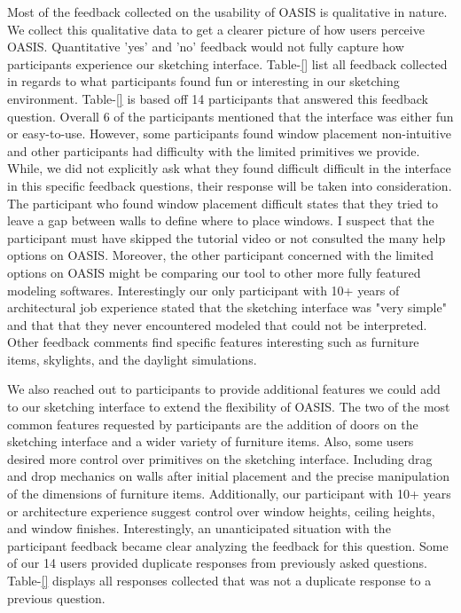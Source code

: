 Most of the feedback collected on the usability of OASIS is qualitative in nature.
We collect this qualitative data to get a clearer picture of how users perceive OASIS.
Quantitative 'yes' and 'no' feedback would not fully capture how participants experience our sketching interface.
Table-\ref{} list all feedback collected in regards to what participants found fun or interesting in our sketching environment.
Table-\ref{} is based off 14 participants that answered this feedback question.
Overall 6 of the participants mentioned that the interface was either fun or easy-to-use.
However, some participants found window placement non-intuitive and other participants had difficulty with the limited primitives we provide.
While, we did not explicitly ask what they found difficult difficult in the interface in this specific feedback questions, their response will be taken into consideration.
The participant who found window placement difficult states that they tried to leave a gap between walls to define where to place windows.
I suspect that the participant must have skipped the tutorial video or not consulted the many help options on OASIS.
Moreover, the other participant concerned with the limited options on OASIS might be comparing our tool to other more fully featured modeling softwares.
Interestingly our only participant with 10+ years of architectural job experience stated that the sketching interface was "very simple" and that that they never encountered modeled that could not be interpreted.
Other feedback comments find specific features interesting such as furniture items, skylights, and the daylight simulations.

We also reached out to participants to provide additional features we could add to our sketching interface to extend the flexibility of OASIS.
The two of the most common features requested by participants are the addition of doors on the sketching interface and a wider variety of furniture items.
Also, some users desired more control over primitives on the sketching interface. Including drag and drop mechanics on walls after initial placement and the precise manipulation of the dimensions of furniture items.
Additionally, our participant with 10+ years or architecture experience suggest control over window heights, ceiling heights, and window finishes.
Interestingly, an unanticipated situation with the participant feedback became clear analyzing the feedback for this question.
Some of our 14 users provided duplicate responses from previously asked questions.
Table-\ref{} displays  all responses collected that was not a duplicate response to a previous question.

